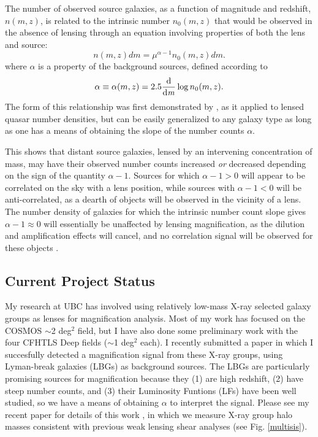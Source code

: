 \documentclass{article}
\begin{document}
The number of observed source galaxies, as a function of magnitude and redshift, $n(m,z)$, is related to the intrinsic number $n_0(m,z)$ that would be observed in the absence of lensing through an equation involving properties of both the lens and source:
\begin{equation}
n(m,z)dm = \mu ^{\alpha -1} n_0(m,z)dm.
\end{equation}
where $\alpha$ is a property of the background sources, defined according to
\begin{equation}
\alpha \equiv \alpha(m,z) = 2.5 \frac{\mathrm d}{\mathrm d \it m} \log n_0(m,z).
\label{alpha}
\end{equation}
The form of this relationship was first demonstrated by \citet{Narayan89}, as it applied to lensed quasar number densities, but can be easily generalized to any galaxy type as long as one has a means of obtaining the slope of the number counts $\alpha$.

This shows that distant source galaxies, lensed by an intervening concentration of mass, may have their observed number counts increased {\it or} decreased depending on the sign of the quantity $\alpha -1$.  Sources for which $\alpha -1 > 0$ will appear to be correlated on the sky with a lens position, while sources with $\alpha -1 < 0$ will be anti-correlated, as a dearth of objects will be observed in the vicinity of a lens.  The number density of galaxies for which the intrinsic number count slope gives $\alpha -1 \approx 0$ will essentially be unaffected by lensing magnification, as the dilution and amplification effects will cancel, and no correlation signal will be observed for these objects \citep{Scranton05}.

\subsection{Current Project Status}
My research at UBC has involved using relatively low-mass X-ray selected galaxy groups as lenses for magnification analysis. Most of my work has focused on the COSMOS $\sim$2 deg$^2$ field, but I have also done some preliminary work with the four CFHTLS Deep fields ($\sim$1 deg$^2$ each). I recently submitted a paper in which I succesfully detected a magnification signal from these X-ray groups, using Lyman-break galaxies (LBGs) as background sources.  The LBGs are particularly promising sources for magnification because they (1) are high redshift, (2) have steep number counts, and (3) their Luminosity Funtions (LFs) have been well studied, so we have a means of obtaining $\alpha$ to interpret the signal. Please see my recent paper for details of this work \citep{Ford11}, in which we measure X-ray group halo masses consistent with previous weak lensing shear analyses (see Fig. \ref{multisis}).
\end{document}
